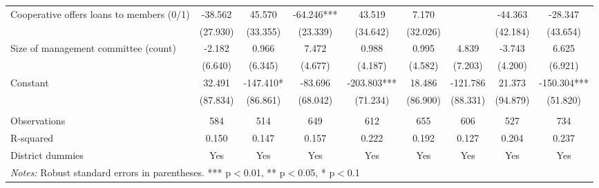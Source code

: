 \documentclass[11pt]{article}
\begin{document}
\begin{landscape}
\begin{table}[H]
{\begin{tabularx}{1.8\linewidth}{lcccccccc}
Cooperative offers loans to members (0/1) & -38.562 & 45.570 & -64.246*** & 43.519 & 7.170 &  & -44.363 & -28.347 \\
 & (27.930) & (33.355) & (23.339) & (34.642) & (32.026) &  & (42.184) & (43.654) \\
Size of management committee (count) & -2.182 & 0.966 & 7.472 & 0.988 & 0.995 & 4.839 & -3.743 & 6.625 \\
 & (6.640) & (6.345) & (4.677) & (4.187) & (4.582) & (7.203) & (4.200) & (6.921) \\
Constant & 32.491 & -147.410* & -83.696 & -203.803*** & 18.486 & -121.786 & 21.373 & -150.304*** \\
 & (87.834) & (86.861) & (68.042) & (71.234) & (86.900) & (88.331) & (94.879) & (51.820) \\
 &  &  &  &  &  &  &  &  \\
Observations & 584 & 514 & 649 & 612 & 655 & 606 & 527 & 734 \\
R-squared & 0.150 & 0.147 & 0.157 & 0.222 & 0.192 & 0.127 & 0.204 & 0.237 \\
 District dummies & Yes & Yes & Yes & Yes & Yes & Yes & Yes & Yes \\ \hline
\multicolumn{9}{l}{\textit{Notes:} Robust standard errors in parentheses. *** p$<$0.01, ** p$<$0.05, * p$<$0.1} \\
  \end{tabularx}}
\end{table}
\doublespacing

\end{landscape}


\newpage

\end{document}
